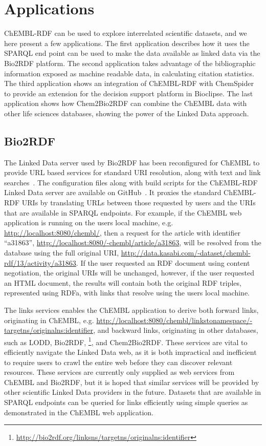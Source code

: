 \documentclass[sw]{iosart2c}
\begin{document}
\section{Applications}

ChEMBL-RDF can be used to explore interrelated scientific datasets, and we here present a few applications. 
The first application describes how it uses the SPARQL end point can be used to make the data available as linked data
via the Bio2RDF platform. The second application takes advantage of the bibliographic information
exposed as machine readable data, in calculating citation statistics. The third application shows
an integration of ChEMBL-RDF with ChemSpider to provide an extension for the decision support
platform in Bioclipse. The last application shows how Chem2Bio2RDF can combine the ChEMBL data
with other life sciences databases, showing the power of the Linked Data approach.

\subsection{Bio2RDF}

The Linked Data server used by Bio2RDF has been reconfigured for ChEMBL to provide URL
based services for standard URI resolution, along with text and link searches~\cite{Ansell2011}. 
The configuration files along with build scripts for the ChEMBL-RDF Linked Data server are available on GitHub~\cite{WebAppGitHub}. 
It proxies the standard ChEMBL-RDF URIs by translating URLs between those requested by users and the URIs that are available
in SPARQL endpoints. For example, if the ChEMBL web application is running on the users
local machine, e.g. \url{http://localhost:8080/chembl/}, then a request for the
article with identifier ``a31863'', \url{http://localhost:8080/-chembl/article/a31863},
will be resolved from the database using the full original URI,
\url{http://data.kasabi.com/-dataset/chembl-rdf/13/activity/a31863}. If the
user requested an RDF document using content negotiation, the original URIs will be unchanged,
however, if the user requested an HTML document, the results will contain both the
original RDF triples, represented using RDFa, with links that resolve using the users local machine.

The links services enables the ChEMBL application to derive both forward links, originating in
ChEMBL, e.g. \url{http://localhost:8080/chembl/linkstonamespace/-targetns/originalns:identifier},
and backward links, originating in other databases, such as LODD, Bio2RDF,
\footnote{\url{http://bio2rdf.org/linksns/targetns/originalns:identifier}}, and Chem2Bio2RDF.
These services are vital to efficiently navigate the Linked Data web, as it is both
impractical and inefficient to require users to crawl the entire web before they can discover 
relevant resources. These services are currently only supplied as web services from ChEMBL and
Bio2RDF, but it is hoped that similar services will be provided by other scientific Linked Data
providers in the future. Datasets that are available in SPARQL endpoints can be queried for
links efficiently using simple queries as demonstrated in the ChEMBL web application.
\end{document}
